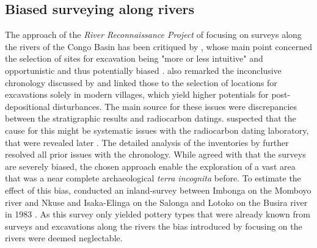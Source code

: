 \documentclass[preprint,10pt,oneside,onecolumn,authoryear]{elsarticle}
\begin{document}
\subsection{Biased surveying along rivers}

The approach of the \textit{River Reconnaissance Project} of focusing on surveys along the rivers of the Congo Basin has been critiqued by \citet[34--36]{Bower.1986}, whose main point concerned the selection of sites for excavation being "more or less intuitive" and opportunistic and thus potentially biased \citep[13 Fnt.~9]{Seidensticker.2021e}. \citep[36]{Bower.1986} also remarked the inconclusive chronology discussed by \citet{Eggert.1983,Eggert.1984a} and linked those to the selection of locations for excavations solely in modern villages, which yield higher potentials for post-depositional disturbances. The main source for these issues were discrepancies between the stratigraphic results and radiocarbon datings. \citet[132--133]{Eggert.1987a} suspected that the cause for this might be systematic issues with the radiocarbon dating laboratory, that were revealed later \citep{Geyh.1990}. The detailed analysis of the inventories by \citet{Wotzka.1995} further resolved all prior issues with the chronology. While \citet[296]{Eggert.1993} agreed with \citet{Bower.1986} that the surveys are severely biased, the chosen approach enable the exploration of a vast area that was a near complete archaeological \textit{terra incognita} before. To estimate the effect of this bias, \citet[303--304]{Eggert.1983} conducted an inland-survey between Imbonga on the Momboyo river and Nkuse and Isaka-Elinga on the Salonga and Lotoko on the Busira river in 1983 \citep[Fig.~\ref{fig:map};][18 Ftn.~3, 26]{Wotzka.1995}. As this survey only yielded pottery types that were already known from surveys and excavations along the rivers the bias introduced by focusing on the rivers were deemed neglectable. 
\end{document}
